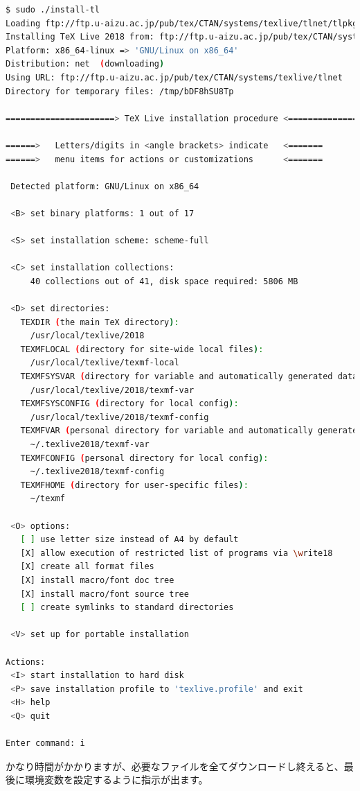 \begin{lstlisting}[language=bash]
$ sudo ./install-tl
Loading ftp://ftp.u-aizu.ac.jp/pub/tex/CTAN/systems/texlive/tlnet/tlpkg/texlive.tlpdb
Installing TeX Live 2018 from: ftp://ftp.u-aizu.ac.jp/pub/tex/CTAN/systems/texlive/tlnet (verified)
Platform: x86_64-linux => 'GNU/Linux on x86_64'
Distribution: net  (downloading)
Using URL: ftp://ftp.u-aizu.ac.jp/pub/tex/CTAN/systems/texlive/tlnet
Directory for temporary files: /tmp/bDF8hSU8Tp

======================> TeX Live installation procedure <=====================

======>   Letters/digits in <angle brackets> indicate   <=======
======>   menu items for actions or customizations      <=======

 Detected platform: GNU/Linux on x86_64
 
 <B> set binary platforms: 1 out of 17

 <S> set installation scheme: scheme-full

 <C> set installation collections:
     40 collections out of 41, disk space required: 5806 MB

 <D> set directories:
   TEXDIR (the main TeX directory):
     /usr/local/texlive/2018
   TEXMFLOCAL (directory for site-wide local files):
     /usr/local/texlive/texmf-local
   TEXMFSYSVAR (directory for variable and automatically generated data):
     /usr/local/texlive/2018/texmf-var
   TEXMFSYSCONFIG (directory for local config):
     /usr/local/texlive/2018/texmf-config
   TEXMFVAR (personal directory for variable and automatically generated data):
     ~/.texlive2018/texmf-var
   TEXMFCONFIG (personal directory for local config):
     ~/.texlive2018/texmf-config
   TEXMFHOME (directory for user-specific files):
     ~/texmf

 <O> options:
   [ ] use letter size instead of A4 by default
   [X] allow execution of restricted list of programs via \write18
   [X] create all format files
   [X] install macro/font doc tree
   [X] install macro/font source tree
   [ ] create symlinks to standard directories

 <V> set up for portable installation

Actions:
 <I> start installation to hard disk
 <P> save installation profile to 'texlive.profile' and exit
 <H> help
 <Q> quit

Enter command: i
\end{lstlisting}

かなり時間がかかりますが、必要なファイルを全てダウンロードし終えると、最後に環境変数を設定するように指示が出ます。

